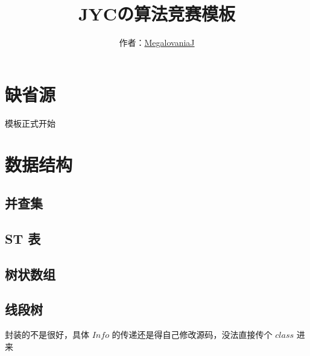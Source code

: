 \documentclass[12pt]{article}
\begin{document}
\title{\vspace{-2cm}\textbf{\huge{JYCの算法竞赛模板}}}
\author{作者：\href{https://codeforces.com/profile/MegalovaniaJ}{MegalovaniaJ}}
\date{}
\maketitle

\tableofcontents

\newpage

{\centering\section{缺省源}}

模板正式开始



\newpage

{\centering\section{数据结构}}

\subsection{并查集}



\newpage

\subsection{ST 表}



\newpage

\subsection{树状数组}



\newpage

\subsection{线段树}

封装的不是很好，具体 $Info$ 的传递还是得自己修改源码，没法直接传个 $class$ 进来
\end{document}

